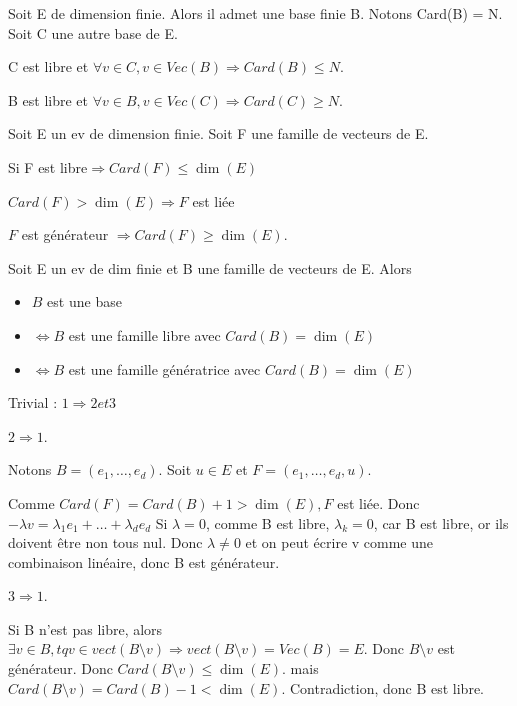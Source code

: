 \documentclass[french]{yLectureNote}
\begin{document}
\begin{myproof}
Soit E de dimension finie. Alors il admet une base finie B. Notons Card(B) = N. Soit C une autre base de E.

C est libre et $\forall v\in C, v\in Vec(B) \Rightarrow Card(B)\leq N$.

B est libre et $\forall v\in B, v\in Vec(C) \Rightarrow Card(C)\geq N$.
\end{myproof}
\begin{proposition}
Soit E un ev de dimension finie. Soit F une famille de vecteurs de E.

Si F est libre\( \Rightarrow Card(F)\leq \dim(E)\)

\(Card(F)>\dim(E) \Rightarrow F\) est liée

\(F\) est générateur \(\Rightarrow Card(F) \geq \dim(E)\).
\end{proposition}
\begin{theorem}[]
 Soit E un ev de dim finie et B une famille de vecteurs de E. Alors
 \begin{itemize}
  \item \(B\) est une base
  \item \(\iff B\) est une famille libre avec \(Card(B) = \dim(E)\)
  \item \(\iff B\) est une famille génératrice avec \(Card(B) = \dim(E)\)
 \end{itemize}
\end{theorem}

\begin{myproof}
Trivial : $1\Rightarrow 2 et 3$

$2\Rightarrow 1$.

Notons $B = (e_1,\dots,e_d)$. Soit $u\in E$ et $F = (e_1,\dots,e_d, u)$.

Comme $Card(F) = Card(B) + 1 > \dim(E), F$ est liée. Donc $-\lambda v = \lambda_1e_1+\dots+\lambda_d e_d$ Si $\lambda = 0$, comme B est libre, $\lambda_k = 0$, car B est libre, or ils doivent \^etre non tous nul. Donc $\lambda \neq 0$ et on peut écrire v comme une combinaison linéaire, donc B est générateur.


$3\Rightarrow 1$.

Si B n'est pas libre, alors $\exists v\in B, tq v\in vect(B\setminus v)\Rightarrow vect(B\setminus v) = Vec(B) = E$. Donc $B\setminus {v}$ est générateur.  Donc $Card(B\setminus v) \leq \dim(E)$. mais $Card(B\setminus v) = Card(B)-1 <\dim(E)$. Contradiction, donc B est libre.
\end{myproof}
\end{document}
